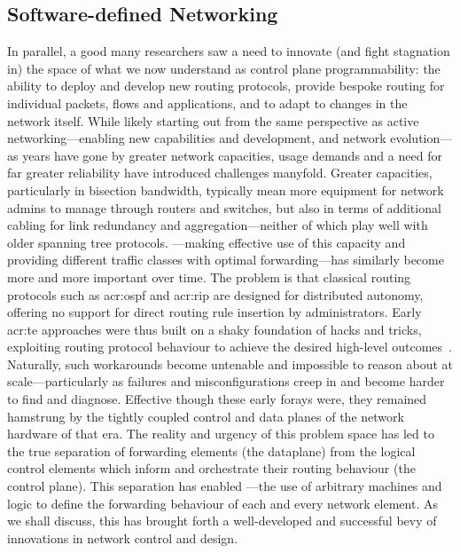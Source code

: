 \subsection{Software-defined Networking}
In parallel, a good many researchers saw a need to innovate (and fight stagnation in) the space of what we now understand as control plane programmability: the ability to deploy and develop new routing protocols, provide bespoke routing for individual packets, flows and applications, and to adapt to changes in the network itself.
While likely starting out from the same perspective as active networking---enabling new capabilities and development, and network evolution---as years have gone by greater network capacities, usage demands and a need for far greater reliability have introduced challenges manyfold.
Greater capacities, particularly in bisection bandwidth, typically mean more equipment for network admins to manage through routers and switches, but also in terms of additional cabling for link redundancy and aggregation---neither of which play well with older spanning tree protocols.
---making effective use of this capacity and providing different traffic classes with optimal forwarding---has similarly become more and more important over time.
The problem is that classical routing protocols such as \gls{acr:ospf} and \gls{acr:rip} are designed for distributed autonomy, offering no support for direct routing rule insertion by administrators.
Early \gls{acr:te} approaches were thus built on a shaky foundation of hacks and tricks, exploiting routing protocol behaviour to achieve the desired high-level outcomes~\parencite{DBLP:journals/ccr/FeamsterRZ14}.
Naturally, such workarounds become untenable and impossible to reason about at scale---particularly as failures and misconfigurations creep in and become harder to find and diagnose.
Effective though these early forays were, they remained hamstrung by the tightly coupled control and data planes of the network hardware of that era.
The reality and urgency of this problem space has led to the true separation of forwarding elements (the dataplane) from the logical control elements which inform and orchestrate their routing behaviour (the control plane).
This separation has enabled ---the use of arbitrary machines and logic to define the forwarding behaviour of each and every network element.
As we shall discuss, this has brought forth a well-developed and successful bevy of innovations in network control and design.

